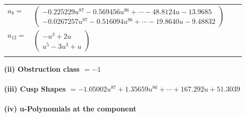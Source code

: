 \documentclass[1p]{elsarticle_modified}
\theoremstyle{definition}
\begin{document}
\begin{tabular}{m{7pt} m{180pt} m{7pt} m{180pt} }
\flushright $a_{8}=$&$\begin{pmatrix}-0.225229 u^{87}-0.569456 u^{86}+\cdots-48.8124 u-13.9685\\-0.0267257 u^{87}-0.516094 u^{86}+\cdots-19.8640 u-9.48832\end{pmatrix}$ \\
\flushright $a_{12}=$&$\begin{pmatrix}- u^3+2 u\\u^5-3 u^3+u\end{pmatrix}$\\&\end{tabular}
\flushleft \textbf{(ii) Obstruction class $= -1$}\\~\\
\flushleft \textbf{(iii) Cusp Shapes $= -1.05002 u^{87}+1.35659 u^{86}+\cdots+167.292 u+51.3039$}\\~\\
\newpage\renewcommand{\arraystretch}{1}
\flushleft \textbf{(iv) u-Polynomials at the component}\newline \\
\end{document}
